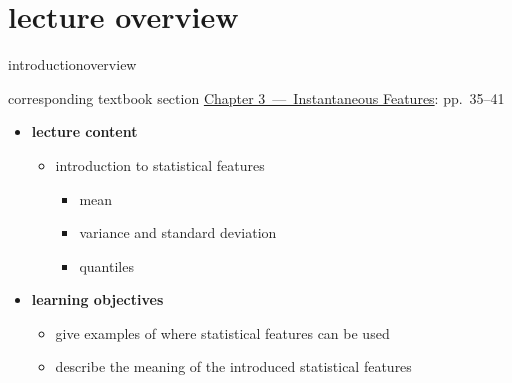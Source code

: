 




\subtitle{Module 3.1: Feature Extraction~---~Statistical Features}


	

    \section[overview]{lecture overview}
        \begin{frame}{introduction}{overview}
            \begin{block}{corresponding textbook section}
                    \href{http://ieeexplore.ieee.org/xpl/articleDetails.jsp?arnumber=6331120}{Chapter 3~---~Instantaneous Features}: pp.~35--41
            \end{block}

            \begin{itemize}
                \item   \textbf{lecture content}
                    \begin{itemize}
                        \item   introduction to statistical features
                            \begin{itemize}
                                \item   mean
                                \item   variance and standard deviation
                                \item   quantiles
                            \end{itemize}
                    \end{itemize}
                \bigskip
                \item<2->   \textbf{learning objectives}
                    \begin{itemize}
                        \item   give examples of where statistical features can be used
                        \item   describe the meaning of the introduced statistical features
                    \end{itemize}
            \end{itemize}
        \end{frame}

